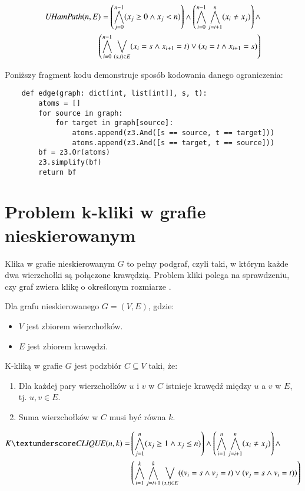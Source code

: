\begin{align*}
	{\mathit{UHamPath}}(n, E) = \left( \bigwedge_{j=0}^{n-1} (x_j \geq 0 \land x_j < n) \right) \land 
	\left( \bigwedge_{i=0}^{n-1} \bigwedge_{j=i+1}^{n} (x_i \neq x_j) \right) \land \\
	\left( \bigwedge_{i=0}^{n-1} \bigvee_{(s,t) \in E} (x_i = s \land x_{i+1} = t) \lor (x_i = t \land x_{i+1} = s) \right)
\end{align*}

Poniższy fragment kodu demonstruje sposób kodowania danego ograniczenia:

\begin{lstlisting}
	def edge(graph: dict[int, list[int]], s, t):
		atoms = []
		for source in graph:
			for target in graph[source]:
				atoms.append(z3.And([s == source, t == target])) 
				atoms.append(z3.And([s == target, t == source]))
		bf = z3.Or(atoms)
		z3.simplify(bf)
		return bf
\end{lstlisting}

\section{Problem k-kliki w grafie nieskierowanym}

Klika w grafie nieskierowanym \(G\) to pełny podgraf, czyli taki, w którym każde dwa wierzchołki są połączone krawędzią. Problem kliki polega na sprawdzeniu, czy graf zwiera klikę o określonym rozmiarze \cite{Sipser0086373}. 

Dla grafu nieskierowanego $G = (V, E)$, gdzie:
\begin{itemize}
	\item \(V\) jest zbiorem wierzchołków.
	\item \(E\) jest zbiorem krawędzi.
\end{itemize}
K-kliką w grafie \(G\) jest podzbiór $C \subseteq V$ taki, że:
\begin{enumerate}
	\item Dla każdej pary wierzchołków \(u\) i \(v\) w \(C\) istnieje krawędź między \(u\) a \(v\) w \(E\), tj. ${u, v}\in E$. 
	\item Suma wierzchołków w \(C\) musi być równa \(k\).
\end{enumerate}

\begin{align*}
	\KCLIQUE(n, k) = &\left( \bigwedge_{j=1}^{n} (x_j \geq 1 \land x_j \leq n) \right) \land 
	\left( \bigwedge_{i=1}^{n} \bigwedge_{j=i+1}^{n} (x_i \neq x_j) \right) \land \\
	&\left( \bigwedge_{i=1}^{k} \bigwedge_{j=i+1}^{k} \bigvee_{(s,t) \in E} ((v_i = s \land v_j = t) \lor (v_j = s \land v_i = t)) \right)	
\end{align*}

